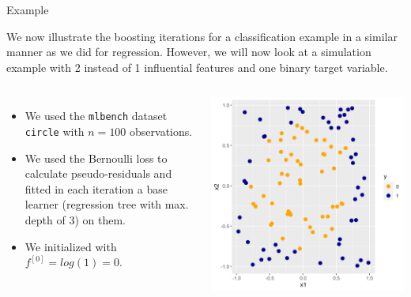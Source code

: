 \begin{vbframe}{Example}

We now illustrate the boosting iterations for a classification example in a similar manner as we did for regression.
However, we will now look at a simulation example with 2 instead of 1 influential features and one binary target variable.

\begin{columns}
\column{5.5cm}
\begin{itemize}
\item We used the \texttt{mlbench} dataset \texttt{circle} with $n = 100$ observations.
\item We used the Bernoulli loss to calculate pseudo-residuals and fitted in each iteration a base learner (regression tree with max. depth of 3) on them.
\item We initialized with $f^{[0]} = log(1) = 0.$
\end{itemize}
\column{4.5cm}
\begin{center}
\includegraphics[width=\textwidth]{figure/boosting_classif_example.png}
\end{center}

\end{columns}



\end{vbframe}

